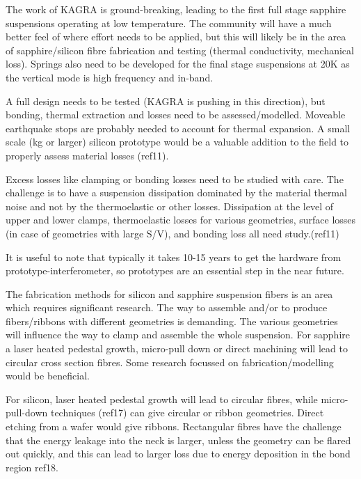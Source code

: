 The work of KAGRA is ground-breaking, leading to the first full stage sapphire suspensions operating at low temperature. The community will have a much better feel of where effort needs to be applied, but this will likely be in the area of sapphire/silicon fibre fabrication and testing (thermal conductivity, mechanical loss). Springs also need to be developed for the final stage suspensions at 20K as the vertical mode is high frequency and in-band.

A full design needs to be tested (KAGRA is pushing in this direction), but bonding, thermal extraction and losses need to be assessed/modelled. Moveable earthquake stops are probably needed to account for thermal expansion. A small scale (kg or larger) silicon prototype would be a valuable addition to the field to properly assess material losses (ref11).

Excess losses like clamping or bonding losses need to be studied with care. The challenge is to have a suspension dissipation dominated by the material thermal noise and not by the thermoelastic or other losses. Dissipation at the level of upper and lower clamps, thermoelastic losses for various geometries, surface losses (in case of geometries with large S/V), and bonding loss all need study.(ref11)

It is useful to note that typically it takes 10-15 years to get the hardware from prototype-interferometer, so prototypes are an essential step in the near future.

The fabrication methods for silicon and sapphire suspension fibers is an area which requires significant research. The way to assemble and/or to produce fibers/ribbons with different geometries is demanding. The various geometries will influence the way to clamp and assemble the whole suspension. For sapphire a laser heated pedestal growth, micro-pull down or direct machining will lead to circular cross section fibres. Some research focussed on fabrication/modelling would be beneficial.

For silicon, laser heated pedestal growth will lead to circular fibres, while micro-pull-down techniques (ref17) can give circular or ribbon geometries. Direct etching from a wafer would give ribbons. Rectangular fibres have the challenge that the energy leakage into the neck is larger, unless the geometry can be flared out quickly, and this can lead to larger loss due to energy deposition in the bond region ref18.


